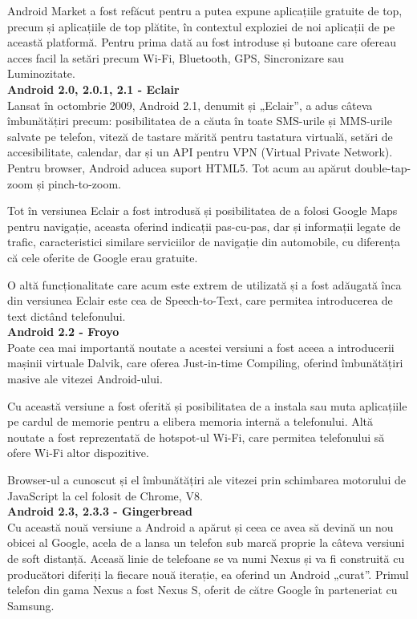 \documentclass[12pt,a4paper]{article}
\begin{document}
	Android Market a fost refăcut pentru a putea expune aplicațiile gratuite de top, precum și aplicațiile de top plătite, în contextul exploziei de noi aplicații de pe această platformă. Pentru prima dată au fost introduse și butoane care ofereau acces facil la setări precum Wi-Fi, Bluetooth, GPS, Sincronizare sau Luminozitate.\\

\textbf{Android 2.0, 2.0.1, 2.1 - Eclair}\\
Lansat în octombrie 2009, Android 2.1, denumit și „Eclair”, a adus câteva îmbunătățiri precum: posibilitatea de a căuta în toate SMS-urile și MMS-urile salvate pe telefon, viteză de tastare mărită pentru tastatura virtuală, setări de accesibilitate, calendar, dar și un API pentru VPN (Virtual Private Network). Pentru browser, Android aducea suport HTML5. Tot acum au apărut double-tap-zoom și pinch-to-zoom.
	
	Tot în versiunea Eclair a fost introdusă și posibilitatea de a folosi Google Maps pentru navigație, aceasta oferind indicații pas-cu-pas, dar și informații legate de trafic, caracteristici similare serviciilor de navigație din automobile, cu diferența că cele oferite de Google erau gratuite.

	O altă funcționalitate care acum este extrem de utilizată și a fost adăugată înca din versiunea Eclair este cea de Speech-to-Text, care permitea introducerea de text dictând telefonului.\\
	
\textbf{Android 2.2 - Froyo}\\
Poate cea mai importantă noutate a acestei versiuni a fost aceea a introducerii mașinii virtuale Dalvik, care oferea Just-in-time Compiling, oferind îmbunătățiri masive ale vitezei Android-ului.

	Cu această versiune a fost oferită și posibilitatea de a instala sau muta aplicațiile pe cardul de memorie pentru a elibera memoria internă a telefonului. Altă noutate a fost reprezentată de hotspot-ul Wi-Fi, care permitea telefonului să ofere Wi-Fi altor dispozitive.

	Browser-ul a cunoscut și el îmbunătățiri ale vitezei prin schimbarea motorului de JavaScript la cel folosit de Chrome, V8.\\

\textbf{Android 2.3, 2.3.3 - Gingerbread}\\
Cu această nouă versiune a Android a apărut și ceea ce avea să devină un nou obicei al Google, acela de a lansa un telefon sub marcă proprie la câteva versiuni de soft distanță. Aceasă linie de telefoane se va numi Nexus și va fi construită cu producători diferiți la fiecare nouă iterație, ea oferind un Android „curat”. Primul telefon din gama Nexus a fost Nexus S, oferit de către Google în parteneriat cu Samsung.
\end{document}
